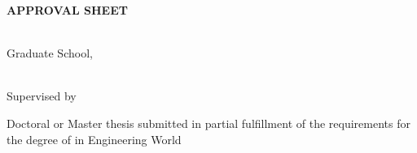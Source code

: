 \newpage 
\cleardoublepage  %

\frontmatterpagenumbers %

\thispagestyle{empty}  %


\begin{center}
    {\bfseries APPROVAL SHEET\\[1\baselineskip]} %
    {\LARGE\bfseries \thesistitle\par}    
    {\large	\department\\ Graduate School, \university\par}
    
    \vspace{1cm}
    
    {\Large {\bfseries \thesisauthor }\\[1\baselineskip]} 
    Supervised by \supervisor\par
    
    \vspace{1cm}
    
    {Doctoral or Master thesis submitted in partial fulfillment of the requirements for the degree of \textbf{\degree} in Engineering World\par}
\end{center}
\vspace{1cm}



